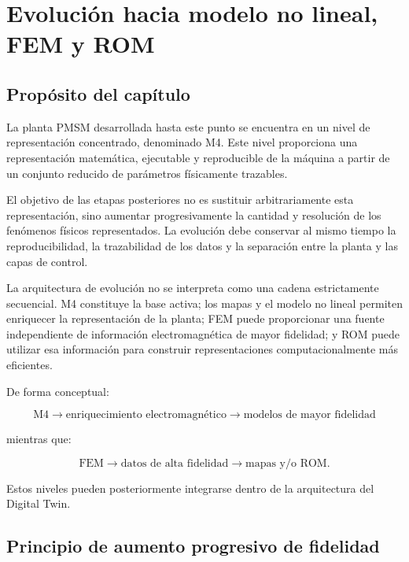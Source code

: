 \section{Evolución hacia modelo no lineal, FEM y ROM}

\subsection{Propósito del capítulo}

La planta PMSM desarrollada hasta este punto se encuentra en un nivel de representación concentrado, denominado M4. Este nivel proporciona una representación matemática, ejecutable y reproducible de la máquina a partir de un conjunto reducido de parámetros físicamente trazables.

El objetivo de las etapas posteriores no es sustituir arbitrariamente esta representación, sino aumentar progresivamente la cantidad y resolución de los fenómenos físicos representados. La evolución debe conservar al mismo tiempo la reproducibilidad, la trazabilidad de los datos y la separación entre la planta y las capas de control.

La arquitectura de evolución no se interpreta como una cadena estrictamente secuencial. M4 constituye la base activa; los mapas y el modelo no lineal permiten enriquecer la representación de la planta; FEM puede proporcionar una fuente independiente de información electromagnética de mayor fidelidad; y ROM puede utilizar esa información para construir representaciones computacionalmente más eficientes.

De forma conceptual:

\begin{equation}
\mathrm{M4}
\rightarrow
\text{enriquecimiento electromagnético}
\rightarrow
\text{modelos de mayor fidelidad}
\end{equation}

mientras que:

\begin{equation}
\mathrm{FEM}
\rightarrow
\text{datos de alta fidelidad}
\rightarrow
\text{mapas y/o ROM}.
\end{equation}

Estos niveles pueden posteriormente integrarse dentro de la arquitectura del Digital Twin.

\subsection{Principio de aumento progresivo de fidelidad}

